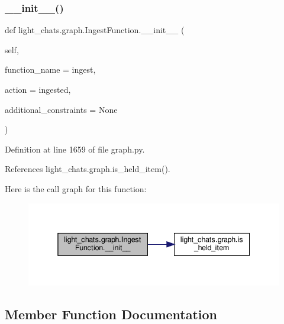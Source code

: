 \subsubsection{\texorpdfstring{\+\_\+\+\_\+init\+\_\+\+\_\+()}{\_\_init\_\_()}}
{\footnotesize\ttfamily def light\+\_\+chats.\+graph.\+Ingest\+Function.\+\_\+\+\_\+init\+\_\+\+\_\+ (\begin{DoxyParamCaption}\item[{}]{self,  }\item[{}]{function\+\_\+name = {\ttfamily \textquotesingle{}ingest\textquotesingle{}},  }\item[{}]{action = {\ttfamily \textquotesingle{}ingested\textquotesingle{}},  }\item[{}]{additional\+\_\+constraints = {\ttfamily None} }\end{DoxyParamCaption})}



Definition at line 1659 of file graph.\+py.



References light\+\_\+chats.\+graph.\+is\+\_\+held\+\_\+item().

Here is the call graph for this function\+:
\nopagebreak
\begin{figure}[H]
\begin{center}
\leavevmode
\includegraphics[width=338pt]{classlight__chats_1_1graph_1_1IngestFunction_ad4e544e64b77af820462e71260a067d5_cgraph}
\end{center}
\end{figure}


\subsection{Member Function Documentation}
\mbox{\label{classlight__chats_1_1graph_1_1IngestFunction_acf3afc20e4e55a9bd2783d2bad592a88}} 
